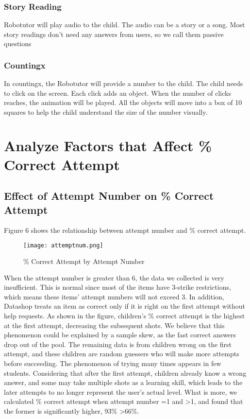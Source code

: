 \documentclass[hyperref]{ctexart}
\begin{document}
\begin{multicols}{2}
    \subsubsection{Story Reading}
    Robotutor will play audio to the child. The audio can be a story or a song. Most story readings don't need any answers from users, so we call them passive questions
    \subsubsection{Countingx}
    In countingx, the Robotutor will provide a number to the child. The child needs to click on the screen. Each click adds an object. When the number of clicks reaches, the animation will be played. All the objects will move into a box of 10 squares to help the child understand the size of the number visually.


	\section{Analyze Factors that Affect \% Correct Attempt}
	\subsection{Effect of Attempt Number on \% Correct Attempt}
	Figure 6 shows the relationship between attempt number and \% correct attempt.
	
	\begin{figure}[H]
    \small
    \centering
    \texttt{[image: attemptnum.png]}
    \caption{\% Correct Attempt by Attempt Number} \label{fig:aa}
    \end{figure}
	

    When the attempt number is greater than 6, the data we collected is very insufficient. This is normal since most of the items have 3-strike restrictions, which means these items' attempt numbers will not exceed 3. In addition, Datashop treats an item as correct only if it is right on the first attempt without help requests. As shown in the figure, children's \% correct attempt is the highest at the first attempt, decreasing the subsequent shots. We believe that this phenomenon could be explained by a sample skew, as the fast correct answers drop out of the pool. The remaining data is from children wrong on the first attempt, and these children are random guessers who will make more attempts before succeeding. The phenomenon of trying many times appears in few students. Considering that after the first attempt, children already know a wrong answer, and some may take multiple shots as a learning skill, which leads to the later attempts to no longer represent the user's actual level. What is more, we calculated \% correct attempt when attempt number =1 and \textgreater 1, and found that the former is significantly higher, 93\% \textgreater 66\%.


\end{multicols}
\end{document}

